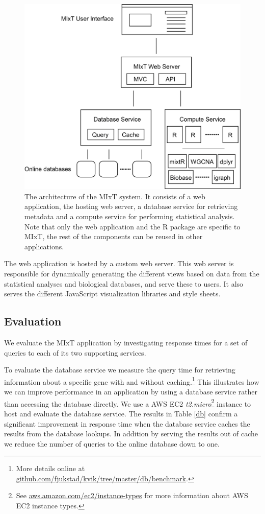 \begin{figure}[h!]
\centering
\includegraphics[scale=0.4]{figures/mixt-architecture.png}
    \caption[The architecture of the MIxT system.]{The architecture of the MIxT
    system. It consists of a web application, the hosting web server, a database
    service for retrieving metadata and a compute service for performing
    statistical analysis. Note that only the web application and the R package
    are specific to MIxT, the rest of the components can be reused in other
    applications.} 
\label{kvik-mixt}
\end{figure} 

The web application is hosted by a custom web server. This web server is
responsible for dynamically generating the different views based on data from
the statistical analyses and biological databases, and serve these to users. It
also serves the different JavaScript visualization libraries and style sheets. 

\subsection{Evaluation} 
We evaluate the MIxT application by investigating response times for a set of
queries to each of its two supporting services. 

To evaluate the database service we measure the query time for retrieving
information about a specific gene with and without caching.\footnote{More
details online at \url{github.com/fjukstad/kvik/tree/master/db/benchmark}.} This
illustrates how we can improve performance in an application by using a database
service rather than accessing the database directly. 
We use a AWS EC2 \emph{t2.micro}\footnote{See
\url{aws.amazon.com/ec2/instance-types} for more information about AWS EC2
instance types.} instance to host and evaluate the database service.  The
results in Table \ref{db} confirm a significant improvement in response time
when the database service caches the results from the database lookups. In
addition by serving the results out of cache we reduce the number of queries to
the online database down to one. 

